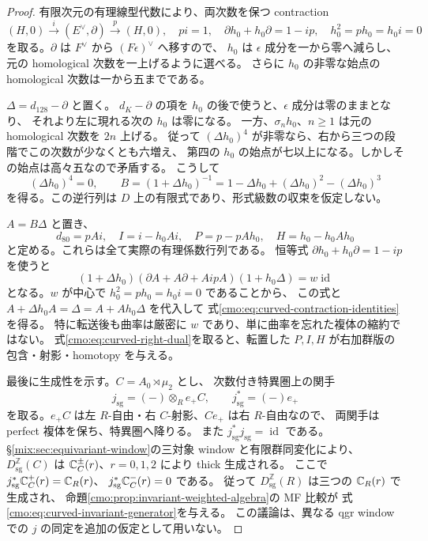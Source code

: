 \begin{proof}
有限次元の有理線型代数により、両次数を保つ contraction
\[
 (H,0)\xrightarrow{i}(E^\vee,\partial)
 \xrightarrow{p}(H,0),\quad
 pi=1,\quad\partial h_0+h_0\partial=1-ip,
 \quad h_0^2=ph_0=h_0i=0
\]
を取る。$\partial$ は $F^\vee$ から $(F\epsilon)^\vee$ へ移すので、
$h_0$ は $\epsilon$ 成分を一から零へ減らし、元の homological 次数を一上げるように選べる。
さらに $h_0$ の非零な始点の homological 次数は一から五までである。

$\Delta=d_{128}-\partial$ と置く。
$d_K-\partial$ の項を $h_0$ の後で使うと、$\epsilon$ 成分は零のままとなり、
それより左に現れる次の $h_0$ は零になる。
一方、$\sigma_nh_0$、$n\ge1$ は元の homological 次数を $2n$ 上げる。
従って $(\Delta h_0)^4$ が非零なら、右から三つの段階でこの次数が少なくとも六増え、
第四の $h_0$ の始点が七以上になる。しかしその始点は高々五なので矛盾する。
こうして
\begin{equation}\label{cmo:eq:curved-finite-inverse}
 (\Delta h_0)^4=0,\qquad
 B=(1+\Delta h_0)^{-1}
   =1-\Delta h_0+(\Delta h_0)^2-(\Delta h_0)^3
\end{equation}
を得る。この逆行列は $D$ 上の有限式であり、形式級数の収束を仮定しない。

$A=B\Delta$ と置き、
\begin{equation}\label{cmo:eq:curved-transfer-formulas}
 d_{80}=pAi,\quad I=i-h_0Ai,\quad P=p-pAh_0,\quad
 H=h_0-h_0Ah_0
\end{equation}
と定める。これらは全て実際の有理係数行列である。
恒等式 $\partial h_0+h_0\partial=1-ip$ を使うと
\[
 (1+\Delta h_0)
 (\partial A+A\partial+AipA)
 (1+h_0\Delta)=w\operatorname{id}
\]
となる。$w$ が中心で $h_0^2=ph_0=h_0i=0$ であることから、
この式と $A+\Delta h_0A=\Delta=A+Ah_0\Delta$ を代入して
式\eqref{cmo:eq:curved-contraction-identities}を得る。
特に転送後も曲率は厳密に $w$ であり、単に曲率を忘れた複体の縮約ではない。
式\eqref{cmo:eq:curved-right-dual}を取ると、転置した $P,I,H$ が右加群版の
包含・射影・homotopy を与える。

最後に生成性を示す。$C=A_0\rtimes\mu_2$ とし、
次数付き特異圏上の関手
\[
 j_{\mathrm{sg}}=(-)\otimes_R e_+C,\qquad
 j_{\mathrm{sg}}^*=(-)e_+
\]
を取る。$e_+C$ は左 $R$-自由・右 $C$-射影、$Ce_+$ は右 $R$-自由なので、
両関手は perfect 複体を保ち、特異圏へ降りる。
また $j_{\mathrm{sg}}^*j_{\mathrm{sg}}=\operatorname{id}$ である。
\S\ref{mix:sec:equivariant-window}の三対象 window と有限群同変化により、
$D_{\mathrm{sg}}^{\mathbb Z}(C)$ は
$\mathbb C_C^\pm(r)$、$r=0,1,2$ により thick 生成される。
ここで $j_{\mathrm{sg}}^*\mathbb C_C^+(r)=\mathbb C_R(r)$、
$j_{\mathrm{sg}}^*\mathbb C_C^-(r)=0$ である。
従って $D_{\mathrm{sg}}^{\mathbb Z}(R)$ は三つの $\mathbb C_R(r)$ で生成され、
命題\ref{cmo:prop:invariant-weighted-algebra}の MF 比較が
式\eqref{cmo:eq:curved-invariant-generator}を与える。
この議論は、異なる qgr window での $j$ の同定を追加の仮定として用いない。
\end{proof}

